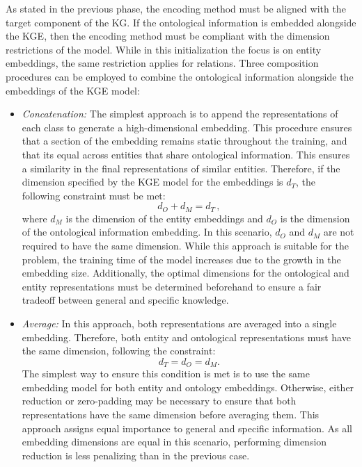 As stated in the previous phase, the encoding method must be aligned with the target component of the KG. If the ontological information is embedded alongside the KGE, then the encoding method must be compliant with the dimension restrictions of the model. While in this initialization the focus is on entity embeddings, the same restriction applies for relations. Three composition procedures can be employed to combine the ontological information alongside the embeddings of the KGE model:
\begin{itemize}
    \item \textit{Concatenation:} The simplest approach is to append the representations of each class to generate a high-dimensional embedding. This procedure ensures that a section of the embedding remains static throughout the training, and that its equal across entities that share ontological information. This ensures a similarity in the final representations of similar entities. Therefore, if the dimension specified by the KGE model for the embeddings is $d_T$, the following constraint must be met:
    \begin{equation}
        d_O+d_M=d_T\,,
    \end{equation}
    where $d_M$ is the dimension of the entity embeddings and $d_O$ is the dimension of the ontological information embedding. In this scenario, $d_O$ and $d_M$ are not required to have the same dimension. While this approach is suitable for the problem, the training time of the model increases due to the growth in the embedding size. Additionally, the optimal dimensions for the ontological and entity representations must be determined beforehand to ensure a fair tradeoff between general and specific knowledge.
    
    \item \textit{Average:} In this approach, both representations are averaged into a single embedding. Therefore, both entity and ontological representations must have the same dimension, following the constraint:
    \begin{equation}
        d_T = d_O = d_M.
    \end{equation}
    The simplest way to ensure this condition is met is to use the same embedding model for both entity and ontology embeddings. Otherwise, either reduction or zero-padding may be necessary to ensure that both representations have the same dimension before averaging them. This approach assigns equal importance to general and specific information. As all embedding dimensions are equal in this scenario, performing dimension reduction is less penalizing than in the previous case.
    

\end{itemize}
